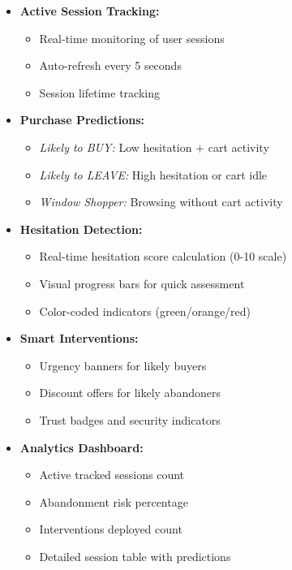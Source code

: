 \documentclass[12pt,a4paper]{article}
\begin{document}
\begin{itemize}[leftmargin=*]
    \item \textbf{Active Session Tracking:}
    \begin{itemize}
        \item Real-time monitoring of user sessions
        \item Auto-refresh every 5 seconds
        \item Session lifetime tracking
    \end{itemize}
    
    \item \textbf{Purchase Predictions:}
    \begin{itemize}
        \item \textit{Likely to BUY:} Low hesitation + cart activity
        \item \textit{Likely to LEAVE:} High hesitation or cart idle
        \item \textit{Window Shopper:} Browsing without cart activity
    \end{itemize}
    
    \item \textbf{Hesitation Detection:}
    \begin{itemize}
        \item Real-time hesitation score calculation (0-10 scale)
        \item Visual progress bars for quick assessment
        \item Color-coded indicators (green/orange/red)
    \end{itemize}
    
    \item \textbf{Smart Interventions:}
    \begin{itemize}
        \item Urgency banners for likely buyers
        \item Discount offers for likely abandoners
        \item Trust badges and security indicators
    \end{itemize}
    
    \item \textbf{Analytics Dashboard:}
    \begin{itemize}
        \item Active tracked sessions count
        \item Abandonment risk percentage
        \item Interventions deployed count
        \item Detailed session table with predictions
    \end{itemize}
\end{itemize}
\end{document}
